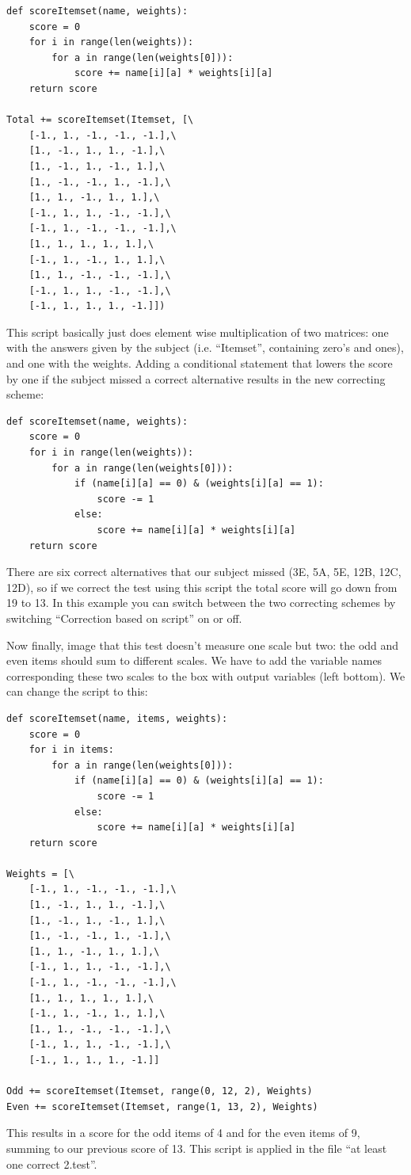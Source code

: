 \documentclass[10pt,a4paper]{article}
\begin{document}
\begin{verbatim}
def scoreItemset(name, weights):
    score = 0
    for i in range(len(weights)):
        for a in range(len(weights[0])):
            score += name[i][a] * weights[i][a]
    return score

Total += scoreItemset(Itemset, [\
    [-1., 1., -1., -1., -1.],\
    [1., -1., 1., 1., -1.],\
    [1., -1., 1., -1., 1.],\
    [1., -1., -1., 1., -1.],\
    [1., 1., -1., 1., 1.],\
    [-1., 1., 1., -1., -1.],\
    [-1., 1., -1., -1., -1.],\
    [1., 1., 1., 1., 1.],\
    [-1., 1., -1., 1., 1.],\
    [1., 1., -1., -1., -1.],\
    [-1., 1., 1., -1., -1.],\
    [-1., 1., 1., 1., -1.]])
\end{verbatim}

This script basically just does element wise multiplication of two matrices: one with the answers given by the subject (i.e. ``Itemset'', containing zero's and ones), and one with the weights. Adding a conditional statement that lowers the score by one if the subject missed a correct alternative results in the new correcting scheme:

\begin{verbatim}
def scoreItemset(name, weights):
    score = 0
    for i in range(len(weights)):
        for a in range(len(weights[0])):
            if (name[i][a] == 0) & (weights[i][a] == 1):
                score -= 1
            else:
                score += name[i][a] * weights[i][a]
    return score
\end{verbatim}

There are six correct alternatives that our subject missed (3E, 5A, 5E, 12B, 12C, 12D), so if we correct the test using this script the total score will go down from 19 to 13. In this example you can switch between the two correcting schemes by switching ``Correction based on script'' on or off.

Now finally, image that this test doesn't measure one scale but two: the odd and even items should sum to different scales. We have to add the variable names corresponding these two scales to the box with output variables (left bottom). We can change the script to this:

\begin{verbatim}
def scoreItemset(name, items, weights):
    score = 0
    for i in items:
        for a in range(len(weights[0])):
            if (name[i][a] == 0) & (weights[i][a] == 1):
                score -= 1
            else:
                score += name[i][a] * weights[i][a]
    return score

Weights = [\
    [-1., 1., -1., -1., -1.],\
    [1., -1., 1., 1., -1.],\
    [1., -1., 1., -1., 1.],\
    [1., -1., -1., 1., -1.],\
    [1., 1., -1., 1., 1.],\
    [-1., 1., 1., -1., -1.],\
    [-1., 1., -1., -1., -1.],\
    [1., 1., 1., 1., 1.],\
    [-1., 1., -1., 1., 1.],\
    [1., 1., -1., -1., -1.],\
    [-1., 1., 1., -1., -1.],\
    [-1., 1., 1., 1., -1.]] 
    
Odd += scoreItemset(Itemset, range(0, 12, 2), Weights)    
Even += scoreItemset(Itemset, range(1, 13, 2), Weights)
\end{verbatim}

This results in a score for the odd items of 4 and for the even items of 9, summing to our previous score of 13. This script is applied in the file ``at least one correct 2.test''.
\end{document}
